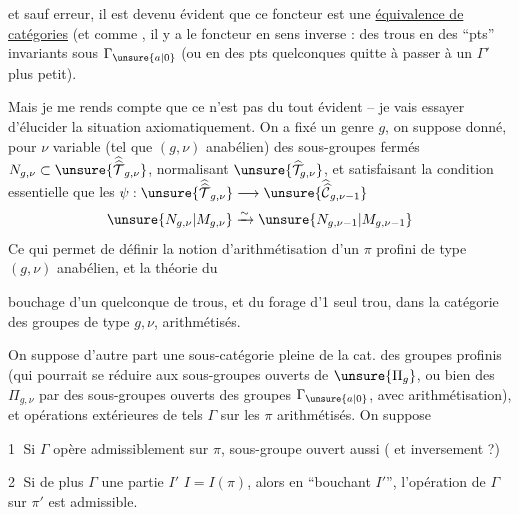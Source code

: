 
et sauf erreur, il est devenu évident
que ce foncteur est une \uline{équivalence de
catégories} (et comme , il
y a le foncteur en sens inverse :
 des trous en des ``pts'' invariants
sous $\Gamma_{\unsure{a|0}}$ (ou en des pts quelconques
quitte à passer à un $\Gamma'$ plus petit).

Mais je me rends compte que
 ce n'est pas du tout évident -- je vais
essayer d'élucider la situation axiomatiquement.
On a fixé un genre $g$,
on suppose donné, pour $\nu$ variable
(tel que $(g,\nu)$ anabélien) des
sous-groupes fermés $N_{g,\nu}\subset\unsure{\widehat{\widehat{\mathcal T}}_{g,\nu}}$,
normalisant $\unsure{\widehat{\mathcal T}_{g,\nu}}$, et satisfaisant la
condition essentielle que les $\psi:\unsure{\widehat{\widehat{\mathcal T}}_{g,\nu}}\longrightarrow\unsure{\widehat{\widehat{\mathcal C}}_{g,\nu-1}}$
\[
\unsure{N_{g,\nu}|M_{g,\nu}}\xrightarrow{\sim}\unsure{N_{g,\nu-1}|M_{g,\nu-1}}
\]
Ce qui permet de définir la notion
d'arithmétisation d'un $\pi$ profini de
type $(g,\nu)$ anabélien, et la théorie du


bouchage d'un  quelconque de trous, et
du forage d'1 seul trou, dans la
catégorie des groupes de type $g,\nu$,
arithmétisés.

On suppose d'autre part  une
sous-catégorie pleine de la cat. des groupes
profinis (qui pourrait se réduire aux
sous-groupes ouverts de $\unsure{\Pi_g}$, ou bien
 des $\Pi_{g,\nu}$ par des sous-groupes
ouverts des groupes $\Gamma_{\unsure{a|0}}$, avec
arithmétisation), et  opérations
extérieures  de tels $\Gamma$ sur les
$\pi$ arithmétisés. On suppose

\textcircled{1} Si $\Gamma$ opère admissiblement sur $\pi$, 
sous-groupe ouvert aussi ( et inversement ?)

\textcircled{2} Si de plus $\Gamma$  une partie $I'$
 $I=I(\pi)$, alors en ``bouchant $I'$'',
l'opération de $\Gamma$ sur $\pi'$ est admissible.


